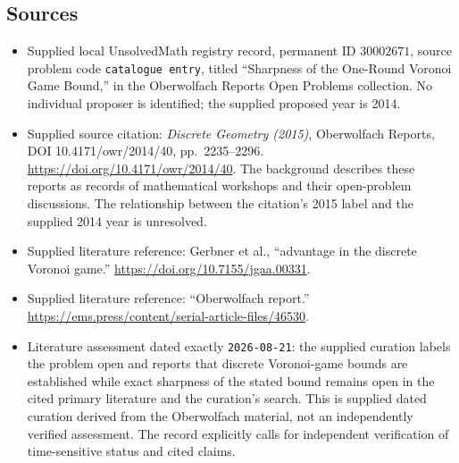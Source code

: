 \documentclass[11pt]{article}
\begin{document}
\subsection{Sources}
\begin{itemize}
\item Supplied local UnsolvedMath registry record, permanent ID \(30002671\), source problem code \texttt{catalogue entry}, titled ``Sharpness of the One-Round Voronoi Game Bound,'' in the Oberwolfach Reports Open Problems collection. No individual proposer is identified; the supplied proposed year is 2014.
\item Supplied source citation: \emph{Discrete Geometry (2015)}, Oberwolfach Reports, DOI 10.4171/owr/2014/40, pp.\ 2235--2296. \url{https://doi.org/10.4171/owr/2014/40}. The background describes these reports as records of mathematical workshops and their open-problem discussions. The relationship between the citation's 2015 label and the supplied 2014 year is unresolved.
\item Supplied literature reference: Gerbner et al., ``advantage in the discrete Voronoi game.'' \url{https://doi.org/10.7155/jgaa.00331}.
\item Supplied literature reference: ``Oberwolfach report.'' \url{https://ems.press/content/serial-article-files/46530}.
\item Literature assessment dated exactly \texttt{2026-08-21}: the supplied curation labels the problem open and reports that discrete Voronoi-game bounds are established while exact sharpness of the stated bound remains open in the cited primary literature and the curation's search. This is supplied dated curation derived from the Oberwolfach material, not an independently verified assessment. The record explicitly calls for independent verification of time-sensitive status and cited claims.
\end{itemize}
\end{document}
